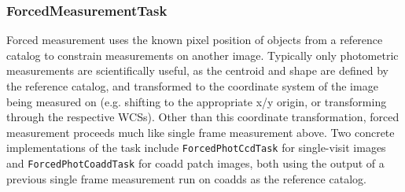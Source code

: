 \subsubsection{ForcedMeasurementTask}
\label{sec:ForcedMeasurementTask}

Forced measurement uses the known pixel position of objects from a reference catalog to constrain measurements on another image.
Typically only photometric measurements are scientifically useful, as the centroid and shape are defined by the reference catalog, and transformed to the coordinate system of the image being measured on (e.g. shifting to the appropriate x/y origin, or transforming through the respective WCSs).
Other than this coordinate transformation, forced measurement proceeds much like single frame measurement above.
Two concrete implementations of the task include \texttt{ForcedPhotCcdTask} for single-visit images and \texttt{ForcedPhotCoaddTask} for coadd patch images, both using the output of a previous single frame measurement run on coadds as the reference catalog.














